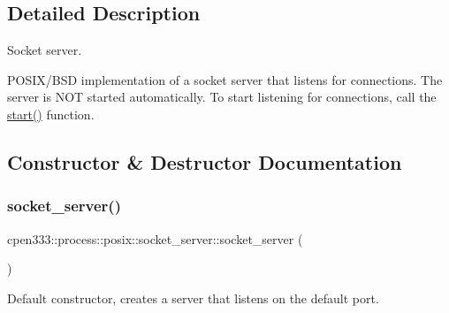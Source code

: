 \subsection{Detailed Description}
Socket server. 

P\+O\+S\+I\+X/\+B\+SD implementation of a socket server that listens for connections. The server is N\+OT started automatically. To start listening for connections, call the \hyperlink{classcpen333_1_1process_1_1posix_1_1socket__server_a0d02be64318ad8d7686633f1bdddc677}{start()} function. 

\subsection{Constructor \& Destructor Documentation}
\mbox{\label{classcpen333_1_1process_1_1posix_1_1socket__server_a2880c0745a27f52a545619f48f7e06bd}} 
\subsubsection{\texorpdfstring{socket\+\_\+server()}{socket\_server()}\hspace{0.1cm}{\footnotesize\ttfamily [1/2]}}
{\footnotesize\ttfamily cpen333\+::process\+::posix\+::socket\+\_\+server\+::socket\+\_\+server (\begin{DoxyParamCaption}{ }\end{DoxyParamCaption})\hspace{0.3cm}{\ttfamily [inline]}}



Default constructor, creates a server that listens on the default port. 

\mbox{\label{classcpen333_1_1process_1_1posix_1_1socket__server_a105715f9f86df458e790db89135a7aac}} 
